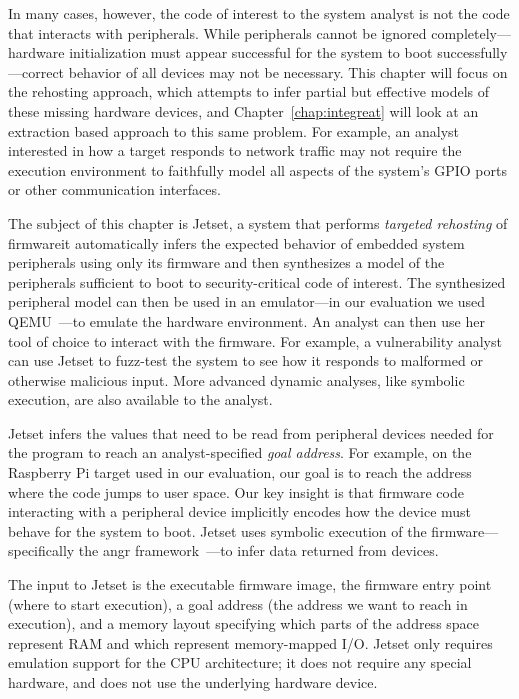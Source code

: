 In many cases, however, the code of interest to the system analyst is not the code that interacts with peripherals. 
While peripherals cannot be ignored completely---hardware initialization must appear successful for the system to boot successfully---correct behavior of all devices may not be necessary. 
This chapter will focus on the rehosting approach, which attempts to infer partial but effective models of these missing hardware devices, and Chapter~\ref{chap:integreat} will look at an extraction based approach to this same problem.
For example, an analyst interested in how a target responds to network traffic may not require the execution environment to faithfully model all aspects of the system's GPIO ports or other communication interfaces.

The subject of this chapter is Jetset, a system that performs \textit{targeted rehosting} of firmware\textemdash it automatically infers the expected behavior of embedded system peripherals using only its firmware and then synthesizes a model of the peripherals sufficient to boot to security-critical code of interest. 
The synthesized peripheral model can then be used in an emulator---in our evaluation we used QEMU~\cite{bellard2005qemu}---to emulate the hardware environment. 
An analyst can then use her tool of choice to interact with the firmware. 
For example, a vulnerability analyst can use Jetset to fuzz-test the system to see how it responds to malformed or otherwise malicious input. 
More advanced dynamic analyses, like symbolic execution, are also available to the analyst.

Jetset infers the values that need to be read from peripheral devices needed for the program to reach an analyst-specified \emph{goal address}. 
For example, on the Raspberry Pi target used in our evaluation, our goal is to reach the address where the code jumps to user space. 
Our key insight is that firmware code interacting with a peripheral device implicitly encodes how the device must behave for the system to boot. 
Jetset uses symbolic execution of the firmware---specifically the angr framework~\cite{wang2017angr}---to infer data returned from devices.  

The input to Jetset is the executable firmware image, the firmware entry point (where to start execution), a goal address (the address we want to reach in execution), and a memory layout specifying which parts of the address space represent RAM and which represent memory-mapped I/O. 
Jetset only requires emulation support for the CPU architecture; it does not require any special hardware, and does not use the underlying hardware device.

